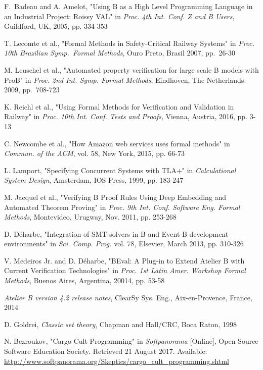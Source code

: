 \documentclass[11pt,journal]{IEEEtran}
\begin{document}
\begin{thebibliography}{2}
		F.~Badeau and A. Amelot, "Using B as a High Level Programming Language in an Industrial Project: Roissy VAL" in \emph{Proc. 4th Int. Conf. Z and B Users}, Guildford, UK, 2005, pp. 334-353
		
		T. Lecomte et al., "Formal Methods in Safety-Critical Railway Systems" in \emph{Proc. 10th Brazilian Symp.~Formal Methods}, Ouro Preto, Brasil 2007, pp.~26-30
		
		M. Leuschel et al., "Automated property verification for large scale B models with ProB" in \emph{Proc. 2nd Int. Symp. Formal Methods}, Eindhoven, The Netherlands. 2009, pp.~708-723
		
		K. Reichl et al., "Using Formal Methods for Verification and Validation in Railway" in \emph{Proc. 10th Int. Conf. Tests and Proofs}, Vienna, Austria, 2016, pp. 3-13
		
		C. Newcombe et al., "How Amazon web services uses formal methods" in \emph{Commun. of the ACM}, vol. 58, New York, 2015, pp. 66-73
		
		L. Lamport, "Specifying Concurrent Systems with TLA+" in \emph{Calculational System Design}, Amsterdam, IOS Press, 1999, pp. 183-247
		
		M. Jacquel et al., "Verifying B Proof Rules Using Deep Embedding and Automated Theorem Proving" in \emph{Proc. 9th Int. Conf. Software Eng. Formal Methods}, Montevideo, Urugway, Nov. 2011, pp. 253-268
		
		D. D\'{e}harbe, "Integration of SMT-solvers in B and Event-B development environments" in \emph{Sci. Comp. Prog.} vol. 78, Elsevier, March 2013, pp. 310-326
		

		
		V. Medeiros Jr. and D. D\'{e}harbe, "BEval: A Plug-in to Extend Atelier B with Current Verification Technologies" in \emph{Proc. 1st Latin Amer. Workshop Formal Methods}, Buenos Aires, Argentina, 20014, pp. 53-58
		
		\emph{Atelier B version 4.2 release notes}, ClearSy Sys. Eng., Aix-en-Provence, France, 2014
		
		D. Goldrei, \emph{Classic set theory}, Chapman and Hall/CRC, Boca Raton, 1998
		
		N. Bezroukov, "Cargo Cult Programming" in \emph{Softpanorama} [Online],  Open Source Software Education Society. Retrieved 21 August 2017. Available: \url{http://www.softpanorama.org/Skeptics/cargo_cult_programming.shtml}
		

\end{thebibliography}
\end{document}
